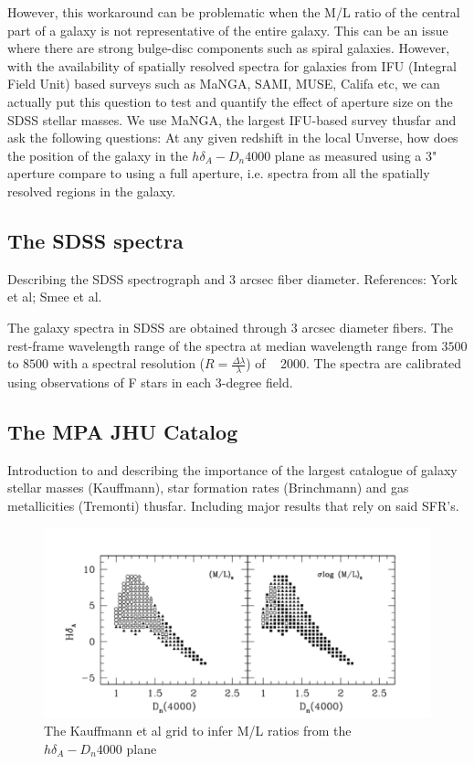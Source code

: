 However, this workaround can be problematic when the M/L ratio of the central part of a galaxy is not representative of the entire galaxy. This can be an issue where there are strong bulge-disc components such as spiral galaxies. However, with the availability of spatially resolved spectra for galaxies from IFU (Integral Field Unit) based surveys such as MaNGA, SAMI, MUSE, Califa etc, we can actually put this question to test and quantify the effect of aperture size on the SDSS stellar masses. We use MaNGA, the largest IFU-based survey thusfar and ask the following questions: At any given redshift in the local Unverse, how does the position of the galaxy in the $h\delta_{A}-D_{n}4000$ plane as measured using a $3$" aperture compare to using a full aperture, i.e. spectra from all the spatially resolved regions in the galaxy.\\


\subsection{The SDSS spectra}
Describing the SDSS spectrograph and $3$ arcsec fiber diameter. References: York et al; Smee et al.

The galaxy spectra in SDSS are obtained through $3$ arcsec diameter fibers. The rest-frame wavelength range of the spectra at median wavelength range from $3500$ to $8500$ with a spectral resolution ($R = \frac{\Delta\lambda}{\lambda}$) of ~ 2000. The spectra are calibrated using observations of F stars in each 3-degree field.

\subsection{The MPA JHU Catalog}
Introduction to and describing the importance of the largest catalogue of galaxy stellar masses (Kauffmann), star formation rates (Brinchmann) and gas metallicities (Tremonti) thusfar. Including major results that rely on said SFR's.

\begin{figure}
\includegraphics[width=\textwidth]{figures/Kauffmann_grid}
\caption[Short figure name.]{The Kauffmann et al grid to infer M/L ratios from the $h\delta_{A}-D_{n}4000$ plane
\label{fig:myInlineFigure}}
\end{figure}

